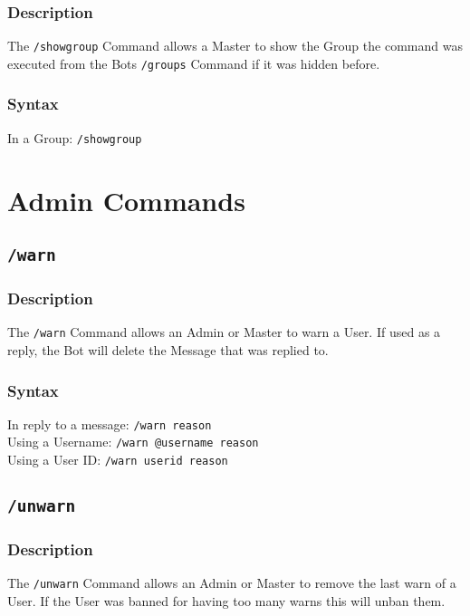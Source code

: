 \documentclass[a4paper]{article}
\begin{document}
        \subsubsection*{Description}
            The \texttt{/showgroup} Command allows a Master to show the Group the command was executed from the Bots \texttt{/groups} Command if it was hidden before.

        \subsubsection*{Syntax}
            In a Group: \texttt{/showgroup}



\section{Admin Commands}

    \subsection{\texttt{/warn}}
        \subsubsection*{Description}
            The \texttt{/warn} Command allows an Admin or Master to warn a User. If used as a reply, the Bot will delete the Message that was replied to.

        \subsubsection*{Syntax}
            In reply to a message: \texttt{/warn reason}\\
            Using a Username: \texttt{/warn @username reason}\\
            Using a User ID: \texttt{/warn userid reason}

    \subsection{\texttt{/unwarn}}
        \subsubsection*{Description}
            The \texttt{/unwarn} Command allows an Admin or Master to remove the last warn of a User. If the User was banned for having too many warns this will unban them.
\end{document}
